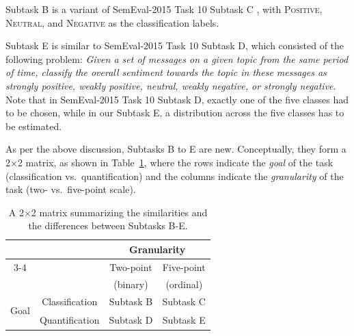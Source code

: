 \documentclass[11pt,letterpaper]{article}
\begin{document}
Subtask B is a variant of SemEval-2015 Task 10 Subtask C \cite{Rosenthal:2015ty,Nakov:2016rm}, with
\textsc{Positive}, \textsc{Neutral}, and \textsc{Negative} as the
classification labels.

Subtask E is similar to SemEval-2015 Task 10 Subtask D, which
consisted of the following problem: \textit{Given a set of messages on
a given topic from the same period of time, classify the overall
sentiment towards the topic in these messages as strongly positive,
weakly positive, neutral, weakly negative, or strongly negative}. Note
that in SemEval-2015 Task 10 Subtask D, exactly one of the five classes
had to be chosen, while in our Subtask E, a distribution across the
five classes has to be estimated.

As per the above discussion, Subtasks B to E are new. %
Conceptually, they form a 2$\times$2 matrix,
as shown in Table~\ref{tab:tasks}, where the rows indicate the \emph{goal}
of the task (classification vs.\ quantification) and the columns
indicate the \emph{granularity} of the task (two- vs.\ five-point scale).

\begin{table}[ht!]
  \begin{center}
    \resizebox{\columnwidth}{!} {
    \begin{tabular}{|c|c||c|c|}
      \hline
      & & \multicolumn{2}{c|}{Granularity} \\
      \cline{3-4}
      & & Two-point & Five-point \\
      & & (binary) & (ordinal) \\
      \hline\hline
      \multirow{2}{*}{\begin{sideways}Goal\end{sideways}} & Classification & Subtask B & Subtask C \\
      \cline{2-4}
      & Quantification & Subtask D & Subtask E \\
      \hline
    \end{tabular}
    }
    \caption{\label{tab:tasks}A 2$\times$2 matrix summarizing the
    similarities and the differences between Subtasks B-E.}
  \end{center}
\end{table}%

\end{document}
